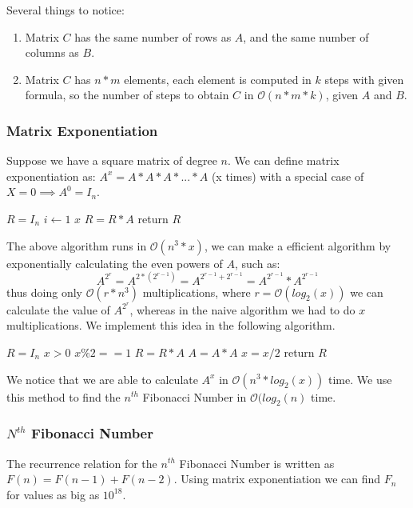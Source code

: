 \documentclass{article}
\begin{document}
Several things to notice:
\begin{enumerate}
    \item Matrix $C$ has the same number of rows as $A$, and the same number of columns as $B$.
    \item Matrix $C$ has $n*m$ elements, each element is computed in $k$ steps with given formula, so the number of steps to obtain $C$ in  $\mathcal{O}(n*m*k)$, given $A$ and $B$.
\end{enumerate}

\subsubsection{Matrix Exponentiation}
Suppose we have a square matrix of degree $n$. We can define matrix exponentiation as:
\newline $A^x = A*A*A*...*A$ (x times)
\newline with a special case of $X=0 \implies A^0 = I_n$.

\begin{codebox}
\li $R = I_n$
\li \For $i \gets 1$ \To $x$
\li \Do $R = R*A$\End
\li return $R$
\end{codebox}

The above algorithm runs in $\mathcal{O}(n^3*x)$, we can make a efficient algorithm by exponentially calculating the even powers of $A$, such as:
$$ A^{2^r} = A^{2*(2^{r-1})} = A^{2^{r-1} + 2^{r-1}} = A^{2^{r-1}}*A^{2^{r-1}} $$
thus doing only $\mathcal{O}(r*n^3)$ multiplications, where $r = \mathcal{O}(log_2(x))$ we can calculate the value of $A^{2^r}$, whereas in the naive algorithm we had to do $x$ multiplications. We implement this idea in the following algorithm.

\begin{codebox}
\li $R = I_n$
\li \While $x > 0$
\li \Do \If $x \% 2== 1$
\li \Do $R = R*A$ \End
\li $A = A*A$
\li $x = x/2$\End
\li return $R$
\end{codebox}

We notice that we are able to calculate $A^x$ in $\mathcal{O}(n^3*log_2(x))$ time. We use this method to find the $n^{th}$ Fibonacci Number in $\mathcal{O}(log_2(n)$ time.

\subsubsection{$N^{th}$ Fibonacci Number}
The recurrence relation for the $n^{th}$ Fibonacci Number is written as $F(n) = F(n-1) + F(n-2)$. Using matrix exponentiation we can find $F_n$ for values as big as $10^{18}$.
\end{document}
